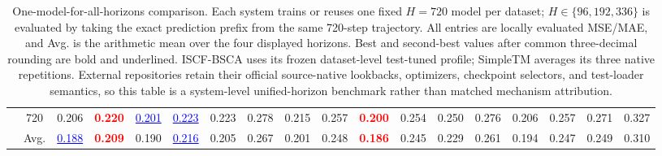 \begin{table}[t]
{\begin{tabular}{cc|cc|cc|cc|cc|cc|cc|cc|cc}
 & 720 & 0.206 & \textcolor{red}{\textbf{0.220}} & \textcolor{blue}{\underline{0.201}} & \textcolor{blue}{\underline{0.223}} & 0.223 & 0.278 & 0.215 & 0.257 & \textcolor{red}{\textbf{0.200}} & 0.254 & 0.250 & 0.276 & 0.206 & 0.257 & 0.271 & 0.327 \\
\cmidrule(lr){2-18}
 & Avg. & \textcolor{blue}{\underline{0.188}} & \textcolor{red}{\textbf{0.209}} & 0.190 & \textcolor{blue}{\underline{0.216}} & 0.205 & 0.267 & 0.201 & 0.248 & \textcolor{red}{\textbf{0.186}} & 0.245 & 0.229 & 0.261 & 0.194 & 0.247 & 0.249 & 0.310 \\
\bottomrule
\end{tabular}%
}
\caption{One-model-for-all-horizons comparison. Each system trains or reuses one fixed $H=720$ model per dataset; $H\in\{96,192,336\}$ is evaluated by taking the exact prediction prefix from the same 720-step trajectory. All entries are locally evaluated MSE/MAE, and Avg. is the arithmetic mean over the four displayed horizons. Best and second-best values after common three-decimal rounding are bold and underlined. ISCF-BSCA uses its frozen dataset-level test-tuned profile; SimpleTM averages its three native repetitions. External repositories retain their official source-native lookbacks, optimizers, checkpoint selectors, and test-loader semantics, so this table is a system-level unified-horizon benchmark rather than matched mechanism attribution.}
\label{tab:main_ii_h720_prefix}
\end{table}
